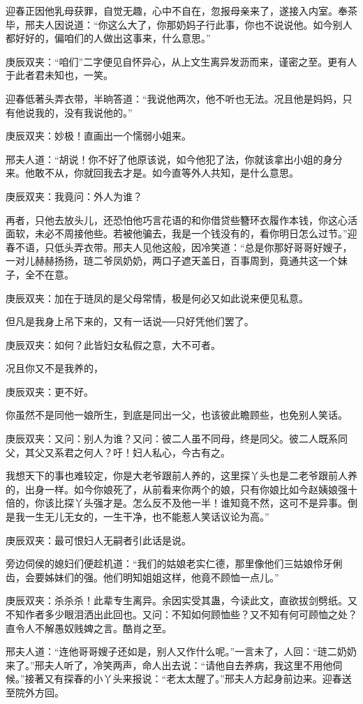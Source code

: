 \begin{parag}
    迎春正因他乳母获罪，自觉无趣，心中不自在，忽报母亲来了，遂接入内室。奉茶毕，邢夫人因说道：“你这么大了，你那奶妈子行此事，你也不说说他。如今别人都好好的，偏咱们的人做出这事来，什么意思。”\begin{note}庚辰双夹：“咱们”二字便见自怀异心，从上文生离异发沥而来，谨密之至。更有人于此者君未知也，一笑。\end{note}迎春低著头弄衣带，半晌答道：“我说他两次，他不听也无法。况且他是妈妈，只有他说我的，没有我说他的。”\begin{note}庚辰双夹：妙极！直画出一个懦弱小姐来。\end{note}邢夫人道：“胡说！你不好了他原该说，如今他犯了法，你就该拿出小姐的身分来。他敢不从，你就回我去才是。如今直等外人共知，是什么意思。\begin{note}庚辰双夹：我竟问：外人为谁？\end{note}再者，只他去放头儿，还恐怕他巧言花语的和你借贷些簪环衣履作本钱，你这心活面软，未必不周接他些。若被他骗去，我是一个钱没有的，看你明日怎么过节。”迎春不语，只低头弄衣带。邢夫人见他这般，因冷笑道：“总是你那好哥哥好嫂子，一对儿赫赫扬扬，琏二爷凤奶奶，两口子遮天盖日，百事周到，竟通共这一个妹子，全不在意。\begin{note}庚辰双夹：加在于琏凤的是父母常情，极是何必又如此说来便见私意。\end{note}但凡是我身上吊下来的，又有一话说──只好凭他们罢了。\begin{note}庚辰双夹：如何？此皆妇女私假之意，大不可者。\end{note}况且你又不是我养的，\begin{note}庚辰双夹：更不好。\end{note}你虽然不是同他一娘所生，到底是同出一父，也该彼此瞻顾些，也免别人笑话。\begin{note}庚辰双夹：又问：别人为谁？又问：彼二人虽不同母，终是同父。彼二人既系同父，其父又系君之何人？吁！妇人私心，今古有之。\end{note}我想天下的事也难较定，你是大老爷跟前人养的，这里探丫头也是二老爷跟前人养的，出身一样。如今你娘死了，从前看来你两个的娘，只有你娘比如今赵姨娘强十倍的，你该比探丫头强才是。怎么反不及他一半！谁知竟不然，这可不是异事。倒是我一生无儿无女的，一生干净，也不能惹人笑话议论为高。”\begin{note}庚辰双夹：最可恨妇人无嗣者引此话是说。\end{note}旁边伺侯的媳妇们便趁机道：“我们的姑娘老实仁德，那里像他们三姑娘伶牙俐齿，会要姊妹们的强。他们明知姐姐这样，他竟不顾恤一点儿。”\begin{note}庚辰双夹：杀杀杀！此辈专生离异。余因实受其蛊，今读此文，直欲拔剑劈纸。又不知作者多少眼泪洒出此回也。又问：不知如何顾恤些？又不知有何可顾恤之处？直令人不解愚奴贱婢之言。酷肖之至。\end{note}邢夫人道：“连他哥哥嫂子还如是，别人又作什么呢。”一言未了，人回：“琏二奶奶来了。”邢夫人听了，冷笑两声，命人出去说：“请他自去养病，我这里不用他伺候。”接著又有探春的小丫头来报说：“老太太醒了。”邢夫人方起身前边来。迎春送至院外方回。
\end{parag}


